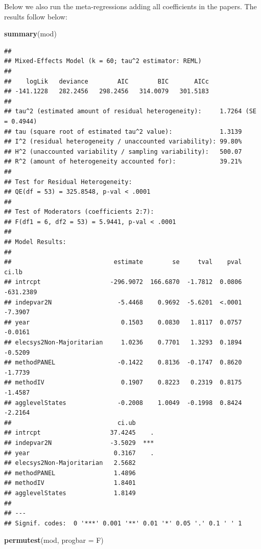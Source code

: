 \documentclass[
]{article}
\newenvironment{Shaded}{\begin{snugshade}}{\end{snugshade}}
\newcommand{\DataTypeTok}[1]{\textcolor[rgb]{0.13,0.29,0.53}{#1}}
\newcommand{\KeywordTok}[1]{\textcolor[rgb]{0.13,0.29,0.53}{\textbf{#1}}}
\newcommand{\NormalTok}[1]{#1}
\begin{document}
Below we also run the meta-regressions adding all coefficients in the
papers. The results follow below:

\begin{Shaded}
\begin{Highlighting}[]
\KeywordTok{summary}\NormalTok{(mod)}
\end{Highlighting}
\end{Shaded}

\begin{verbatim}
## 
## Mixed-Effects Model (k = 60; tau^2 estimator: REML)
## 
##    logLik   deviance        AIC        BIC       AICc 
## -141.1228   282.2456   298.2456   314.0079   301.5183   
## 
## tau^2 (estimated amount of residual heterogeneity):     1.7264 (SE = 0.4944)
## tau (square root of estimated tau^2 value):             1.3139
## I^2 (residual heterogeneity / unaccounted variability): 99.80%
## H^2 (unaccounted variability / sampling variability):   500.07
## R^2 (amount of heterogeneity accounted for):            39.21%
## 
## Test for Residual Heterogeneity:
## QE(df = 53) = 325.8548, p-val < .0001
## 
## Test of Moderators (coefficients 2:7):
## F(df1 = 6, df2 = 53) = 5.9441, p-val < .0001
## 
## Model Results:
## 
##                            estimate        se     tval    pval      ci.lb 
## intrcpt                   -296.9072  166.6870  -1.7812  0.0806  -631.2389 
## indepvar2N                  -5.4468    0.9692  -5.6201  <.0001    -7.3907 
## year                         0.1503    0.0830   1.8117  0.0757    -0.0161 
## elecsys2Non-Majoritarian     1.0236    0.7701   1.3293  0.1894    -0.5209 
## methodPANEL                 -0.1422    0.8136  -0.1747  0.8620    -1.7739 
## methodIV                     0.1907    0.8223   0.2319  0.8175    -1.4587 
## agglevelStates              -0.2008    1.0049  -0.1998  0.8424    -2.2164 
##                             ci.ub 
## intrcpt                   37.4245    . 
## indepvar2N                -3.5029  *** 
## year                       0.3167    . 
## elecsys2Non-Majoritarian   2.5682      
## methodPANEL                1.4896      
## methodIV                   1.8401      
## agglevelStates             1.8149      
## 
## ---
## Signif. codes:  0 '***' 0.001 '**' 0.01 '*' 0.05 '.' 0.1 ' ' 1
\end{verbatim}

\begin{Shaded}
\begin{Highlighting}[]
\KeywordTok{permutest}\NormalTok{(mod, }\DataTypeTok{progbar =}\NormalTok{ F)}
\end{Highlighting}
\end{Shaded}
\end{document}
